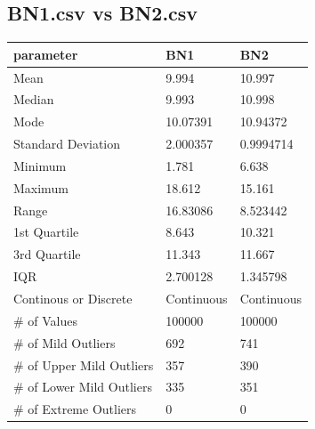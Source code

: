 \documentclass[10pt]{article}
\begin{document}
\subsection*{BN1.csv vs BN2.csv}
\begin{table}[h!]
  \begin{center}
    \scriptsize
    \begin{tabular}{lll}
      \toprule
      parameter & BN1 & BN2\\
      \midrule
 	Mean & 9.994 & 10.997\\
	Median & 9.993 & 10.998\\
	Mode & 10.07391 & 10.94372\\
	Standard Deviation & 2.000357 & 0.9994714\\
	Minimum & 1.781 & 6.638\\
	Maximum & 18.612 & 15.161\\
	Range & 16.83086 & 8.523442\\
	1st Quartile & 8.643 & 10.321\\
	3rd Quartile & 11.343 & 11.667\\
	IQR & 2.700128 & 1.345798\\ 
	Continous or Discrete & Continuous & Continuous\\   
	\# of Values & 100000 & 100000\\  
	\# of Mild Outliers & 692 & 741\\
	\# of Upper Mild Outliers & 357 & 390\\
	\# of Lower Mild Outliers & 335 & 351\\
	\# of Extreme Outliers & 0 & 0\\
       \bottomrule
    \end{tabular}
  \end{center}
\end{table}
\end{document}
